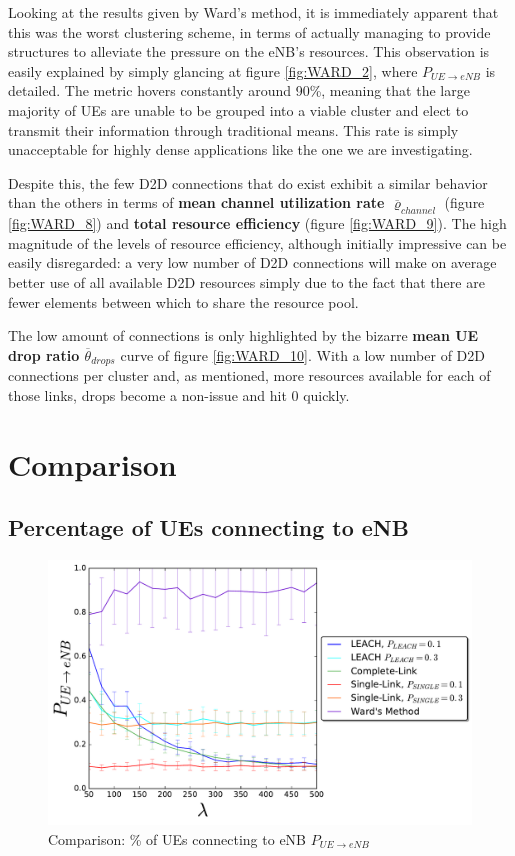 Looking at the results given by Ward's method, it is immediately apparent that this was the worst clustering scheme, in terms of actually managing to provide structures to alleviate the pressure on the eNB's resources. This observation is easily explained by simply glancing at figure \ref{fig:WARD_2}, where $P_{UE\rightarrow eNB}$ is detailed. The metric hovers constantly around 90\%, meaning that the large majority of UEs are unable to be grouped into a viable cluster and elect to transmit their information through traditional means. This rate is simply unacceptable for highly dense applications like the one we are investigating.

Despite this, the few D2D connections that do exist exhibit a similar behavior than the others in terms of \textbf{mean channel utilization rate $\overline{\varrho}_{channel}$} (figure \ref{fig:WARD_8}) and \textbf{total resource efficiency} (figure \ref{fig:WARD_9}). The high magnitude of the levels of resource efficiency, although initially impressive can be easily disregarded: a very low number of D2D connections will make on average better use of all available D2D resources simply due to the fact that there are fewer elements between which to share the resource pool.

The low amount of connections is only highlighted by the bizarre \textbf{mean UE drop ratio $\overline{\theta}_{drops}$} curve of figure \ref{fig:WARD_10}. With a low number of D2D connections per cluster and, as mentioned, more resources available for each of those links, drops become a non-issue and hit 0 quickly.

\clearpage

\section{Comparison}\label{Comparison}
\subsection{Percentage of UEs connecting to eNB}
\begin{figure}
\centering
\captionsetup{justification=centering}
\includegraphics[width=1\linewidth]{figures/COMPARE_2}
\caption{Comparison: \% of UEs connecting to eNB $P_{UE\rightarrow eNB}$ }
\label{fig:COMPARE_2}
\end{figure}

